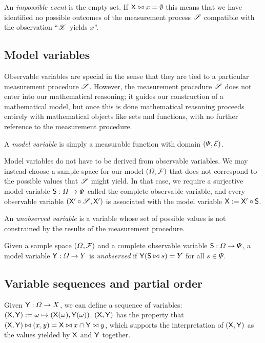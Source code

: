 An \emph{impossible event} is the empty set. If $\mathsf{X}\bowtie x=\emptyset$ this means that we have identified no possible outcomes of the measurement process $\mathscr{S}$ compatible with the observation ``$\mathscr{X}$ yields $x$''. 

\subsection{Model variables}

Observable variables are special in the sense that they are tied to a particular measurement procedure $\mathscr{S}$. However, the measurement procedure $\mathscr{S}$ does not enter into our mathematical reasoning; it guides our construction of a mathematical model, but once this is done mathematical reasoning proceeds entirely with mathematical objects like sets and functions, with no further reference to the measurement procedure.

A \emph{model variable} is simply a measurable function with domain $(\Psi,\mathcal{E})$.

Model variables do not have to be derived from observable variables. We may instead choose a sample space for our model $(\Omega,\mathcal{F})$ that does not correspond to the possible values that $\mathscr{S}$ might yield. In that case, we require a surjective model variable $\mathsf{S}:\Omega\to \Psi$ called the complete observable variable, and every observable variable $(\mathsf{X}'\circ \mathscr{S},\mathsf{X}')$ is associated with the model variable $\mathsf{X}:=\mathsf{X}'\circ \mathsf{S}$.

An \emph{unobserved variable} is a variable whose set of possible values is not constrained by the results of the measurement procedure.

\begin{definition}\label{def:unobserved_variable}
Given a sample space $(\Omega,\mathcal{F})$ and a complete observable variable $\mathsf{S}:\Omega\to\Psi$, a model variable $\mathsf{Y}:\Omega\to Y$ is \emph{unobserved} if $\mathsf{Y}(\mathsf{S}\bowtie s)=Y$ for all $s\in \Psi$.
\end{definition}

\subsection{Variable sequences and partial order}

Given $\mathsf{Y}:\Omega\to X$, we can define a sequence of variables: $(\mathsf{X},\mathsf{Y}):=\omega\mapsto (\mathsf{X}(\omega),\mathsf{Y}(\omega))$. $(\mathsf{X},\mathsf{Y})$ has the property that $(\mathsf{X},\mathsf{Y})\bowtie (x,y)= \mathsf{X}\bowtie x\cap \mathsf{Y}\bowtie y$, which supports the interpretation of $(\mathsf{X},\mathsf{Y})$ as the values yielded by $\mathsf{X}$ and $\mathsf{Y}$ together.

